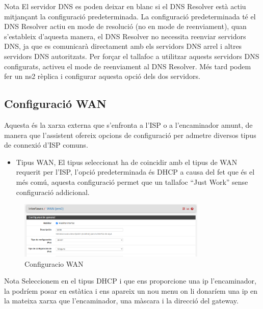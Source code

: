 \documentclass[
  10pt,
]{krantz}
\providecommand{\tightlist}{%
  \setlength{\itemsep}{0pt}\setlength{\parskip}{0pt}}
\begin{document}
\begin{rmdinfo}{Nota}
El servidor DNS es poden deixar en blanc si el DNS Resolver està actiu mitjançant la configuració predeterminada. La configuració predeterminada té el DNS Resolver actiu en mode de resolució (no en mode de reenviament), quan s'estableix d'aquesta manera, el DNS Resolver no necessita reenviar servidors DNS, ja que es comunicarà directament amb els servidors DNS arrel i altres servidors DNS autoritzats. Per forçar el tallafoc a utilitzar aquests servidors DNS configurats, activeu el mode de reenviament al DNS Resolver. Més tard podem fer un ns2 rèplica i configurar aquesta opció dels dos servidors.

\end{rmdinfo}

\hypertarget{configuraciuxf3-wan}{%
\subsection{Configuració WAN}\label{configuraciuxf3-wan}}

Aquesta és la xarxa externa que s'enfronta a l'ISP o a l'encaminador amunt, de manera que l'assistent ofereix opcions de configuració per admetre diversos tipus de connexió d'ISP comuns.

\begin{itemize}
\tightlist
\item
  Tipus WAN, El tipus seleccionat ha de coincidir amb el tipus de WAN requerit per l'ISP, l'opció predeterminada és DHCP a causa del fet que és el més comú, aquesta configuració permet que un tallafoc ``Just Work'' sense configuració addicional.
\end{itemize}

\begin{figure}
\centering
\includegraphics[width=0.8\textwidth,height=\textheight]{imatges/pfsense_WAN.png}
\caption{Configuracio WAN}
\end{figure}

\begin{rmdtip}{Nota}
Seleccionem en el tipus DHCP i que ens proporcione una ip l'encaminador, la podríem posar en estàtica i ens apareix un nou menu on li donaríem una ip en la mateixa xarxa que l'encaminador, una màscara i la direcció del gateway.

\end{rmdtip}
\end{document}
